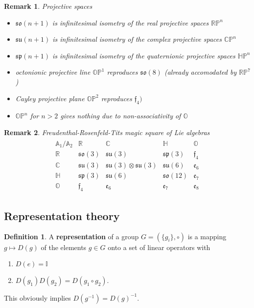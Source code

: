 \documentclass[10pt,a4paper]{article}
\newtheorem{remark}{Remark}[section]
\theoremstyle{definition}
\newtheorem{definition}{Definition}[section]
\begin{document}
\begin{remark}{}
Projective spaces
\begin{itemize}
    \item $\mathfrak{so}(n+1)$ is infinitesimal isometry of the real projective spaces $\mathbb{RP}^n$
    \item $\mathfrak{su}(n+1)$ is infinitesimal isometry of the complex projective spaces $\mathbb{CP}^n$
    \item $\mathfrak{sp}(n+1)$ is infinitesimal isometry of the quaternionic projective spaces $\mathbb{HP}^n$
    \item octonionic projective line $\mathbb{OP}^1$ reproduces $\mathfrak{so}(8)$ (already accomodated by $\mathbb{RP}^7$)
    \item Cayley projective plane $\mathbb{OP}^2$ reproduces $\mathfrak{f}_4)$
    \item $\mathbb{OP}^n$ for $n>2$ gives nothing due to non-associativity of $\mathbb{O}$
\end{itemize}
\end{remark}

\begin{remark}{}
Freudenthal-Rosenfeld-Tits magic square of Lie algebras
\begin{align}
\begin{array}{c||cccc}
\mathbb{A}_1/\mathbb{A}_2 & \mathbb{R} & \mathbb{C} & \mathbb{H} & \mathbb{O}\\ \hline\hline
\mathbb{R} & \mathfrak{so}(3) & \mathfrak{su}(3) & \mathfrak{sp}(3) & \mathfrak{f}_4 \\
\mathbb{C} & \mathfrak{su}(3) & \mathfrak{su}(3)\otimes\mathfrak{su}(3) & \mathfrak{su}(6) & \mathfrak{e}_6  \\
\mathbb{H} & \mathfrak{sp}(3) & \mathfrak{su}(6) & \mathfrak{so}(12) & \mathfrak{e}_7  \\
\mathbb{O} & \mathfrak{f}_4   & \mathfrak{e}_6 & \mathfrak{e}_7& \mathfrak{e}_8 
\end{array}
\end{align}
\end{remark}



\subsection{Representation theory}
\theoremstyle{definition}
\begin{definition}{}
A {\bf representation} of a group $G=\left(\{g_i\},\circ\right)$ is a mapping $g\mapsto D(g)$ of the elements $g\in G$ onto a set of linear operators with
\begin{enumerate}
    \item $D(e)=\mathbb{I}$
    \item $D(g_1)D(g_2) = D(g_1\circ g_2)$.
\end{enumerate}
This obviously implies $D(g^{-1})=D(g)^{-1}$.
\end{definition}
\end{document}
